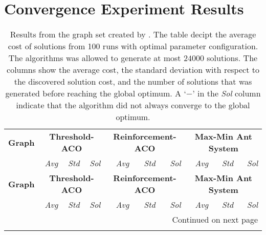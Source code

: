 \chapter{Convergence Experiment Results}\label{appendix:result_tables}

{\tiny
\renewcommand{\arraystretch}{1.2}
\begin{longtable}{lrrrrrrrrr}
   \caption[Experiment Results from the graph set created by \textcite{Monteiro2013}]{Results from the graph set created by \textcite{Monteiro2013}. The table decipt the average cost of solutions from 100 runs with optimal parameter configuration. The algorithms was allowed to generate at most $24000$ solutions. The columns show the average cost, the standard deviation with respect to the discovered solution cost, and the number of solutions that was generated before reaching the global optimum. A `$-$' in the \emph{Sol} column indicate that the algorithm did not always converge to the global optimum.}\\
   \toprule
   
  \textbf{Graph} & \multicolumn{3}{c}{\textbf{Threshold\@{-}ACO}} & \multicolumn{3}{c}{\textbf{Reinforcement\@{-}ACO}} & \multicolumn{3}{c}{\textbf{Max\@{-}Min Ant System}} \\
  \cmidrule(lr){2-4}
  \cmidrule(lr){5-7}
  \cmidrule(lr){8-10}
  & \emph{Avg} & \emph{Std} & \emph{Sol} & \emph{Avg} & \emph{Std} & \emph{Sol} & \emph{Avg} & \emph{Std} & \emph{Sol}\\
  \cmidrule(lr){2-2}
  \cmidrule(lr){3-3}
  \cmidrule(lr){4-4}
  \cmidrule(lr){5-5}
  \cmidrule(lr){6-6}
  \cmidrule(lr){7-7}
  \cmidrule(lr){8-8}
  \cmidrule(lr){9-9}
  \cmidrule(lr){10-10}
  \endfirsthead
  
  \textbf{Graph} & \multicolumn{3}{c}{\textbf{Threshold\@{-}ACO}} & \multicolumn{3}{c}{\textbf{Reinforcement\@{-}ACO}} & \multicolumn{3}{c}{\textbf{Max\@{-}Min Ant System}} \\
  \cmidrule(lr){2-4}
  \cmidrule(lr){5-7}
  \cmidrule(lr){8-10}
  & \emph{Avg} & \emph{Std} & \emph{Sol} & \emph{Avg} & \emph{Std} & \emph{Sol} & \emph{Avg} & \emph{Std} & \emph{Sol}\\
  \cmidrule(lr){2-2}
  \cmidrule(lr){3-3}
  \cmidrule(lr){4-4}
  \cmidrule(lr){5-5}
  \cmidrule(lr){6-6}
  \cmidrule(lr){7-7}
  \cmidrule(lr){8-8}
  \cmidrule(lr){9-9}
  \cmidrule(lr){10-10}
  \endhead
  
  \cmidrule(lr){8-10}
  \multicolumn{10}{r}{Continued on next page} \\
  \endfoot
  

\end{longtable}}
